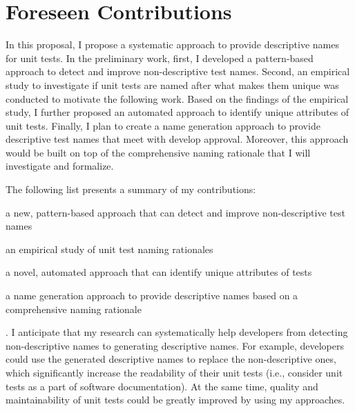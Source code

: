 \section{Foreseen Contributions}
\label{sec:contributions}

In this proposal, I propose a systematic approach to provide descriptive names for unit tests.
%
In the preliminary work, first, I developed a pattern-based approach to detect and improve non-descriptive test names.
%
Second, an empirical study to investigate if unit tests are named after what makes them unique was conducted to motivate the following work.
%
Based on the findings of the empirical study, I further proposed an automated approach to identify unique attributes of unit tests.
%
Finally, I plan to create a name generation approach to provide descriptive test names that meet with develop approval.
%
Moreover, this approach would be built on top of the comprehensive naming rationale that I will investigate and formalize.

The following list presents a summary of my contributions:
\begin{enumerate*}
    \item a new, pattern-based approach that can detect and improve non-descriptive test names
    \item an empirical study of unit test naming rationales
    \item a novel, automated approach that can identify unique attributes of tests
    \item a name generation approach to provide descriptive names based on a comprehensive naming rationale
\end{enumerate*}.
%
I anticipate that my research can systematically help developers from detecting non-descriptive names to generating descriptive names.
%
For example, developers could use the generated descriptive names to replace the non-descriptive ones, which significantly increase the readability of their unit tests (i.e., consider unit tests as a part of software documentation).
%
At the same time, quality and maintainability of unit tests could be greatly improved by using my approaches.